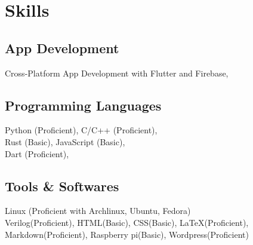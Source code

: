 \documentclass[]{m abbas resume' 2022}
\begin{document}
\begin{minipage}[t]{0.53\textwidth}
    


\section{Skills}
\subsection{App Development}
Cross-Platform App Development with Flutter and Firebase,

\subsection{Programming Languages}
Python (Proficient), 
C/C++ (Proficient), \\
Rust (Basic),
JavaScript (Basic),\\ 
Dart (Proficient), 

\subsection{Tools \& Softwares}
Linux (Proficient with Archlinux, Ubuntu, Fedora) \\ 
Verilog(Proficient), 
HTML(Basic),
CSS(Basic),
LaTeX(Proficient),
Markdown(Proficient), 
Raspberry pi(Basic), 
Wordpress(Proficient) \\



%
%

\end{minipage} 
\hfill
\end{document}
